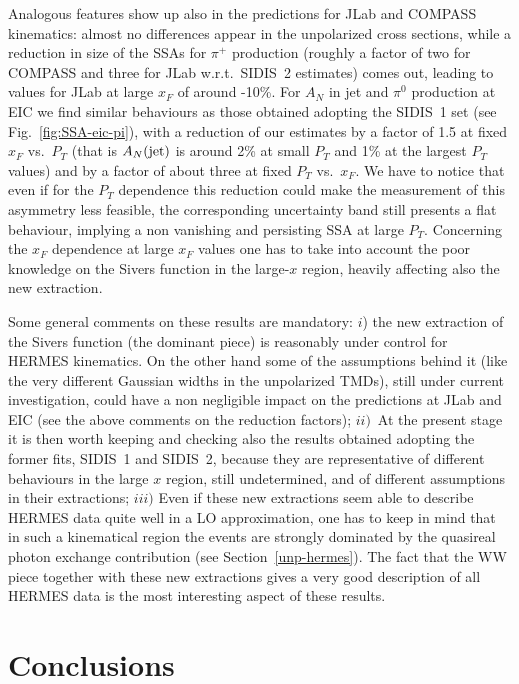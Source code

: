 \documentclass[nofootinbib,superscriptaddress,aps]{revtex4}
\begin{document}
Analogous features show up also in the predictions for JLab and COMPASS kinematics: almost no differences appear in the unpolarized cross sections, while a reduction in size of the SSAs for $\pi^+$ production (roughly a factor of two for COMPASS and three for JLab w.r.t.~SIDIS~2 estimates) comes out, leading to values for JLab at large $x_F$ of around -10\%. For $A_N$ in jet and $\pi^0$ production at EIC we find similar behaviours as those obtained adopting the SIDIS~1 set (see Fig.~\ref{fig:SSA-eic-pi}), with a reduction of our estimates by a factor of 1.5 at fixed $x_F$ vs.~$P_T$  (that is $A_N({\rm jet})$ is around 2\% at small $P_T$ and 1\% at the largest $P_T$ values) and by a factor of about three at fixed $P_T$ vs.~$x_F$. We have to notice that even if for the $P_T$ dependence this reduction could make the measurement of this asymmetry less feasible, the corresponding uncertainty band still presents a flat behaviour, implying a non vanishing and persisting SSA at large $P_T$. Concerning the $x_F$ dependence at large $x_F$ values one has to take into account the poor knowledge on the Sivers function in the large-$x$ region, heavily affecting also the new extraction.

Some general comments on these results are mandatory: $i$) the new extraction of the Sivers function (the dominant piece) is reasonably under control for HERMES kinematics. On the other hand some of the assumptions behind it (like the very different Gaussian widths in the unpolarized TMDs), still under current investigation, could have a non negligible impact on the predictions at JLab and EIC (see the above comments on the reduction factors); $ii)$~At the present stage it is then worth keeping and checking also the results obtained adopting the former fits, SIDIS~1 and SIDIS~2, because they are representative of different behaviours in the large $x$ region, still undetermined, and of different assumptions in their extractions; $iii)$ Even if these new extractions seem able to describe HERMES data quite well in a LO approximation, one has to keep in mind that in such a kinematical region the events are strongly dominated by the quasireal photon exchange contribution (see Section~\ref{unp-hermes}). The fact that the WW piece together with these new extractions gives a very good description of all HERMES data is the most interesting aspect of these results.


\section{Conclusions}
\label{concl}
\end{document}
